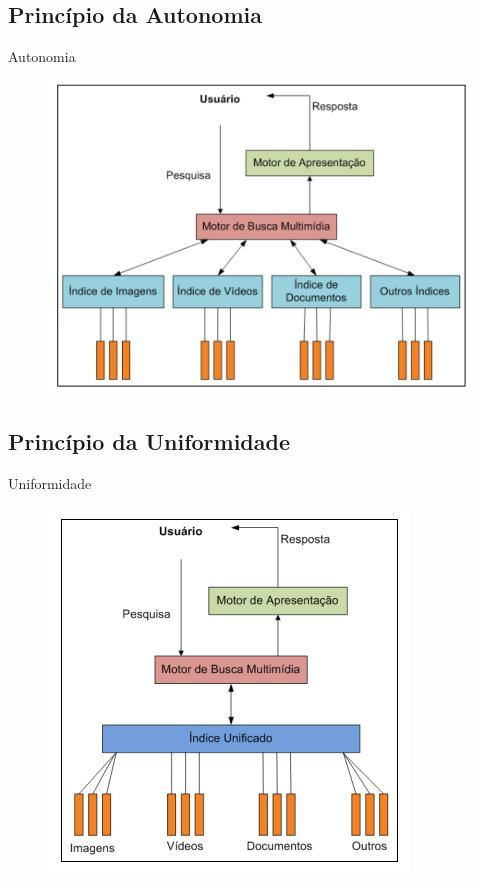 \documentclass{beamer}
\begin{document}
    \subsection{Princípio da Autonomia}
        \begin{frame}{Autonomia}
                
            \begin{figure}[htpb]
                \begin{center}
                    \includegraphics[width=0.8\linewidth]{pic/Autonomia.png}
                \end{center}
            \end{figure}
            
        \end{frame}
        
    \subsection{Princípio da Uniformidade }
        \begin{frame}{Uniformidade} 
                
            \begin{figure}[htpb]
                \begin{center}
                    \includegraphics[width=0.5\linewidth]{pic/Uniformidade.png}
                \end{center}
            \end{figure}
            
        \end{frame}
        
\end{document}
